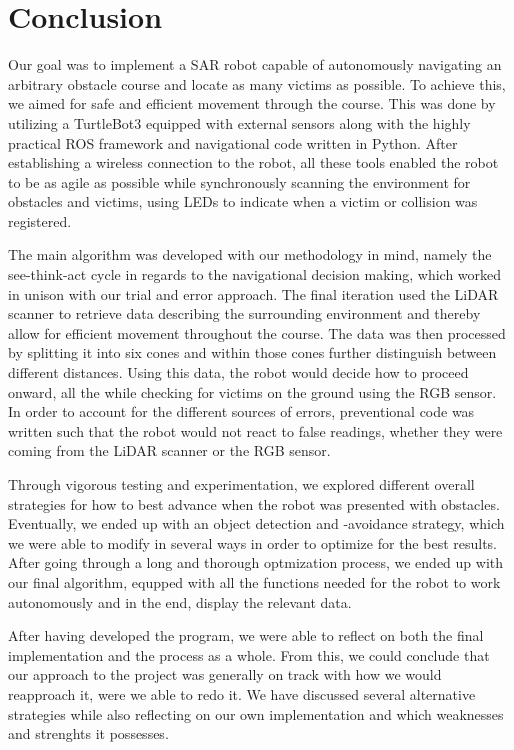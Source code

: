 \documentclass[conference]{IEEEtran}
\begin{document}
\section{Conclusion}
Our goal was to implement a SAR robot capable of autonomously navigating an arbitrary obstacle course and locate as many victims as possible.
To achieve this, we aimed for safe and efficient movement through the course.
This was done by utilizing a TurtleBot3 equipped with external sensors along with the highly practical ROS framework and navigational code written in Python.
After establishing a wireless connection to the robot, all these tools enabled the robot to be as agile as possible while synchronously scanning the environment for obstacles and victims, using LEDs to indicate when a victim or collision was registered.

The main algorithm was developed with our methodology in mind, namely the see-think-act cycle in regards to the navigational decision making, which worked in unison with our trial and error approach.
The final iteration used the LiDAR scanner to retrieve data describing the surrounding environment and thereby allow for efficient movement throughout the course.
The data was then processed by splitting it into six cones and within those cones further distinguish between different distances.
Using this data, the robot would decide how to proceed onward, all the while checking for victims on the ground using the RGB sensor.
In order to account for the different sources of errors, preventional code was written such that the robot would not react to false readings, whether they were coming from the LiDAR scanner or the RGB sensor.

Through vigorous testing and experimentation, we explored different overall strategies for how to best advance when the robot was presented with obstacles.
Eventually, we ended up with an object detection and -avoidance strategy, which we were able to modify in several ways in order to optimize for the best results.
After going through a long and thorough optmization process, we ended up with our final algorithm, equpped with all the functions needed for the robot to work autonomously and in the end, display the relevant data.

After having developed the program, we were able to reflect on both the final implementation and the process as a whole.
From this, we could conclude that our approach to the project was generally on track with how we would reapproach it, were we able to redo it.
We have discussed several alternative strategies while also reflecting on our own implementation and which weaknesses and strenghts it possesses.
\end{document}
